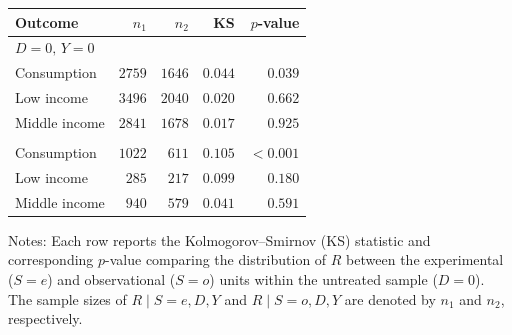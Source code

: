 \begin{threeparttable}
\begin{tabular}{lrrrr}
\toprule
Outcome & $n_1$ & $n_2$ & KS & $p$-value \\
\midrule
\multicolumn{5}{l}{$D=0,\, Y=0$}\\
\quad Consumption & $2759$ & $1646$ & $0.044$ & $0.039$ \\
\quad Low income & $3496$ & $2040$ & $0.020$ & $0.662$ \\
\quad Middle income & $2841$ & $1678$ & $0.017$ & $0.925$ \\
\addlinespace[0.6em]
\multicolumn{5}{l}{$D=0,\, Y=1$}\\
\quad Consumption & $1022$ & $611$ & $0.105$ & $<0.001$ \\
\quad Low income & $285$ & $217$ & $0.099$ & $0.180$ \\
\quad Middle income & $940$ & $579$ & $0.041$ & $0.591$ \\
\bottomrule
\end{tabular}
\begin{tablenotes}[flushleft]
\small
\item Notes: Each row reports the Kolmogorov--Smirnov (KS) statistic and corresponding $p$-value comparing the distribution of $R$ between the experimental ($S=e$) and observational ($S=o$) units within the untreated sample ($D=0$). The sample sizes of $R \mid S=e, D, Y$ and $R \mid S=o, D, Y$ are denoted by $n_1$ and $n_2$, respectively.
\end{tablenotes}
\end{threeparttable}
